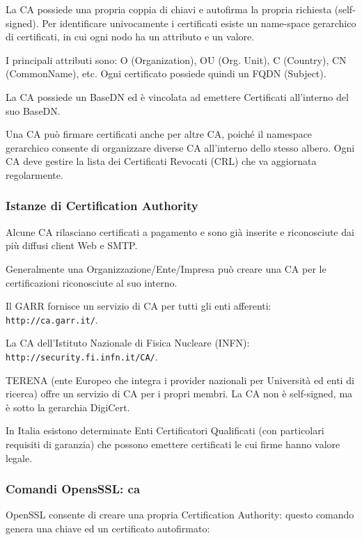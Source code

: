             La CA possiede una propria coppia di chiavi e autofirma la propria richiesta (self-signed). Per identificare univocamente i certificati esiste un name-space gerarchico di certificati, in cui ogni nodo ha un attributo e un valore.
        
            I principali attributi sono: O (Organization), OU (Org. Unit), C (Country), CN (CommonName), etc. Ogni certificato possiede quindi un FQDN (Subject).
        
            La CA possiede un BaseDN ed è vincolata ad emettere Certificati all'interno del suo BaseDN.
        
            Una CA può firmare certificati anche per altre CA, poiché il namespace gerarchico consente di organizzare diverse CA all'interno dello stesso albero. Ogni CA deve gestire la lista dei Certificati Revocati (CRL) che va aggiornata regolarmente.

        \subsubsection{Istanze di Certification Authority}
            Alcune CA rilasciano certificati a pagamento e sono già inserite e riconosciute dai più diffusi client Web e SMTP.
        
            Generalmente una Organizzazione/Ente/Impresa può creare una CA per le certificazioni riconosciute al suo interno.
        
            Il GARR fornisce un servizio di CA per tutti gli enti afferenti:\\\verb|http://ca.garr.it/|.
        
            La CA dell'Istituto Nazionale di Fisica Nucleare (INFN):\\\verb|http://security.fi.infn.it/CA/|.
        
            TERENA (ente Europeo che integra i provider nazionali per Università ed enti di ricerca) offre un servizio di CA per i propri membri. La CA non è self-signed, ma è sotto la gerarchia DigiCert.
        
            In Italia esistono determinate Enti Certificatori Qualificati (con particolari requisiti di garanzia) che possono emettere certificati le cui firme hanno valore legale.

        \subsubsection{Comandi OpensSSL: ca}
            OpenSSL consente di creare una propria Certification Authority: questo comando genera una chiave ed un certificato autofirmato:

